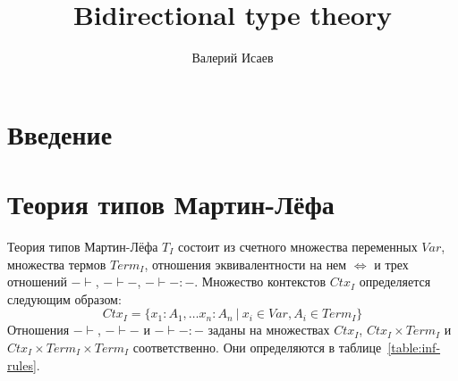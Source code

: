 \documentclass{amsart}
\theoremstyle{definition}
\theoremstyle{remark}
\newcommand{\deq}{\Leftrightarrow}
\numberwithin{figure}{section}
\begin{document}
\title{Bidirectional type theory}

\author{Валерий Исаев}


\maketitle

\section{Введение}

\section{Теория типов Мартин-Лёфа}

Теория типов Мартин-Лёфа $T_I$ состоит из счетного множества переменных $Var$, множества термов $Term_I$, отношения эквивалентности на нем $\deq$ и трех отношений $- \vdash$, $- \vdash -$, $- \vdash - : - $.
Множество контекстов $Ctx_I$ определяется следующим образом:
\[ Ctx_I = \{ x_1 : A_1, \ldots x_n : A_n\ |\ x_i \in Var, A_i \in Term_I \} \]
Отношения $- \vdash$, $- \vdash -$ и $- \vdash - : -$ заданы на множествах $Ctx_I$, $Ctx_I \times Term_I$ и $Ctx_I \times Term_I \times Term_I$ соответственно.
Они определяются в таблице~\ref{table:inf-rules}.
\end{document}
